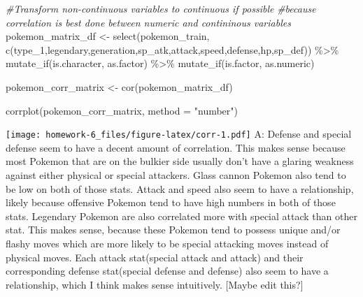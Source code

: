\documentclass[
]{article}
\newenvironment{Shaded}{\begin{snugshade}}{\end{snugshade}}
\newcommand{\AttributeTok}[1]{\textcolor[rgb]{0.77,0.63,0.00}{#1}}
\newcommand{\CommentTok}[1]{\textcolor[rgb]{0.56,0.35,0.01}{\textit{#1}}}
\newcommand{\FunctionTok}[1]{\textcolor[rgb]{0.00,0.00,0.00}{#1}}
\newcommand{\NormalTok}[1]{#1}
\newcommand{\OtherTok}[1]{\textcolor[rgb]{0.56,0.35,0.01}{#1}}
\newcommand{\SpecialCharTok}[1]{\textcolor[rgb]{0.00,0.00,0.00}{#1}}
\newcommand{\StringTok}[1]{\textcolor[rgb]{0.31,0.60,0.02}{#1}}
\begin{document}
\begin{Shaded}
\begin{Highlighting}[]
\CommentTok{\#Transform non{-}continuous variables to continuous if possible}
\CommentTok{\#because correlation is best done between numeric and contininous variables}
\NormalTok{pokemon\_matrix\_df }\OtherTok{\textless{}{-}} \FunctionTok{select}\NormalTok{(pokemon\_train, }\FunctionTok{c}\NormalTok{(}\StringTok{\textquotesingle{}type\_1\textquotesingle{}}\NormalTok{,}\StringTok{\textquotesingle{}legendary\textquotesingle{}}\NormalTok{,}\StringTok{\textquotesingle{}generation\textquotesingle{}}\NormalTok{,}\StringTok{\textquotesingle{}sp\_atk\textquotesingle{}}\NormalTok{,}\StringTok{\textquotesingle{}attack\textquotesingle{}}\NormalTok{,}\StringTok{\textquotesingle{}speed\textquotesingle{}}\NormalTok{,}\StringTok{\textquotesingle{}defense\textquotesingle{}}\NormalTok{,}\StringTok{\textquotesingle{}hp\textquotesingle{}}\NormalTok{,}\StringTok{\textquotesingle{}sp\_def\textquotesingle{}}\NormalTok{)) }\SpecialCharTok{\%\textgreater{}\%}
  \FunctionTok{mutate\_if}\NormalTok{(is.character, as.factor) }\SpecialCharTok{\%\textgreater{}\%}
  \FunctionTok{mutate\_if}\NormalTok{(is.factor, as.numeric)}

\NormalTok{pokemon\_corr\_matrix }\OtherTok{\textless{}{-}} \FunctionTok{cor}\NormalTok{(pokemon\_matrix\_df)}

\FunctionTok{corrplot}\NormalTok{(pokemon\_corr\_matrix, }\AttributeTok{method =} \StringTok{"number"}\NormalTok{)}
\end{Highlighting}
\end{Shaded}

\texttt{[image: homework-6\_files/figure-latex/corr-1.pdf]} A: Defense
and special defense seem to have a decent amount of correlation. This
makes sense because most Pokemon that are on the bulkier side usually
don't have a glaring weakness against either physical or special
attackers. Glass cannon Pokemon also tend to be low on both of those
stats. Attack and speed also seem to have a relationship, likely because
offensive Pokemon tend to have high numbers in both of those stats.
Legendary Pokemon are also correlated more with special attack than
other stat. This makes sense, because these Pokemon tend to possess
unique and/or flashy moves which are more likely to be special attacking
moves instead of physical moves. Each attack stat(special attack and
attack) and their corresponding defense stat(special defense and
defense) also seem to have a relationship, which I think makes sense
intuitively. {[}Maybe edit this?{]}
\end{document}
